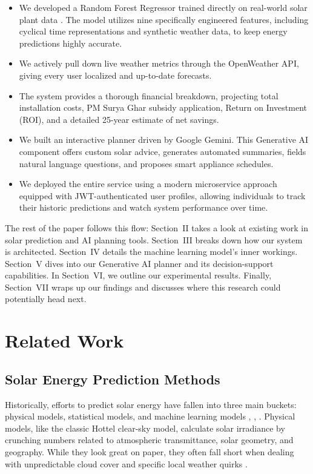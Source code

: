 \documentclass[conference]{IEEEtran}
\begin{document}
\begin{itemize}
\item We developed a Random Forest Regressor trained directly on real-world solar plant data \cite{b12}. The model utilizes nine specifically engineered features, including cyclical time representations and synthetic weather data, to keep energy predictions highly accurate.
\item We actively pull down live weather metrics through the OpenWeather API, giving every user localized and up-to-date forecasts.
\item The system provides a thorough financial breakdown, projecting total installation costs, PM Surya Ghar subsidy application, Return on Investment (ROI), and a detailed 25-year estimate of net savings.
\item We built an interactive planner driven by Google Gemini. This Generative AI component offers custom solar advice, generates automated summaries, fields natural language questions, and proposes smart appliance schedules.
\item We deployed the entire service using a modern microservice approach equipped with JWT-authenticated user profiles, allowing individuals to track their historic predictions and watch system performance over time.
\end{itemize}

The rest of the paper follows this flow: Section~II takes a look at existing work in solar prediction and AI planning tools. Section~III breaks down how our system is architected. Section~IV details the machine learning model's inner workings. Section~V dives into our Generative AI planner and its decision-support capabilities. In Section~VI, we outline our experimental results. Finally, Section~VII wraps up our findings and discusses where this research could potentially head next.

\section{Related Work}

\subsection{Solar Energy Prediction Methods}

Historically, efforts to predict solar energy have fallen into three main buckets: physical models, statistical models, and machine learning models \cite{b3}, \cite{b14}, \cite{b16}. Physical models, like the classic Hottel clear-sky model, calculate solar irradiance by crunching numbers related to atmospheric transmittance, solar geometry, and geography. While they look great on paper, they often fall short when dealing with unpredictable cloud cover and specific local weather quirks \cite{b6}.
\end{document}
